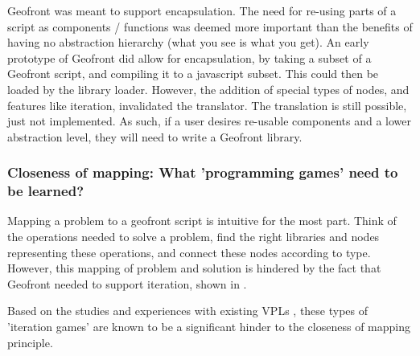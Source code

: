 Geofront was meant to support encapsulation. 
The need for re-using parts of a script as components / functions was deemed more important than the benefits of having no abstraction hierarchy (what you see is what you get).
An early prototype of Geofront did allow for encapsulation, by taking a subset of a Geofront script, and compiling it to a javascript subset. This could then be loaded by the library loader. 
However, the addition of special types of nodes, and features like iteration, invalidated the  translator.
The translation is still possible, just not implemented.  
As such, if a user desires re-usable components and a lower abstraction level, they will need to write a Geofront library.


\subsubsection*{Closeness of mapping: What 'programming games' need to be learned?}

Mapping a problem to a geofront script is intuitive for the most part.
Think of the operations needed to solve a problem, 
find the right libraries and nodes representing these operations,
and connect these nodes according to type. 
However, this mapping of problem and solution is hindered by the fact that Geofront needed to support iteration, shown in . 

Based on the studies and experiences with existing VPLs , these types of 'iteration games' are known to be a significant hinder to the closeness of mapping principle.

